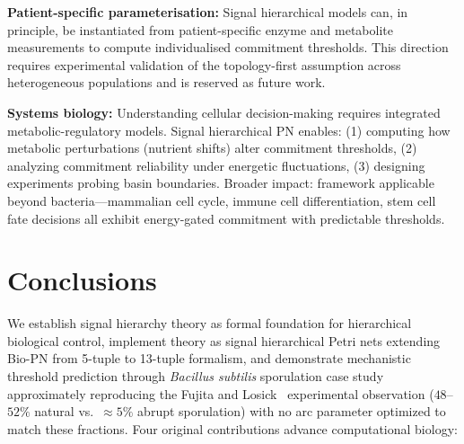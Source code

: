 \documentclass[10pt,letterpaper]{article}
\begin{document}
\textbf{Patient-specific parameterisation:} Signal hierarchical models can, in principle, be instantiated from patient-specific enzyme and metabolite measurements to compute individualised commitment thresholds. This direction requires experimental validation of the topology-first assumption across heterogeneous populations and is reserved as future work.

\textbf{Systems biology:} Understanding cellular decision-making requires integrated metabolic-regulatory models. Signal hierarchical PN enables: (1) computing how metabolic perturbations (nutrient shifts) alter commitment thresholds, (2) analyzing commitment reliability under energetic fluctuations, (3) designing experiments probing basin boundaries. Broader impact: framework applicable beyond bacteria---mammalian cell cycle, immune cell differentiation, stem cell fate decisions all exhibit energy-gated commitment with predictable thresholds.

\section{Conclusions}

We establish signal hierarchy theory as formal foundation for hierarchical biological control, implement theory as signal hierarchical Petri nets extending Bio-PN from 5-tuple to 13-tuple formalism, and demonstrate mechanistic threshold prediction through \textit{Bacillus subtilis} sporulation case study approximately reproducing the Fujita and Losick~\cite{fujita2005} experimental observation ($48$--$52\%$ natural vs.\ $\approx 5\%$ abrupt sporulation) with no arc parameter optimized to match these fractions. Four original contributions advance computational biology:
\end{document}
